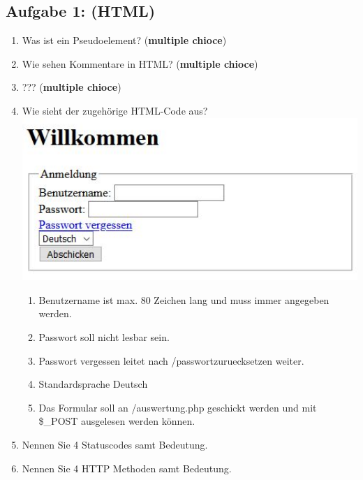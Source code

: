 \subsection{Aufgabe 1: (HTML)}
\label{sec:Aufgabe1}
\begin{enumerate}[label=\alph*)]
    \item Was ist ein Pseudoelement? (\textbf{multiple chioce})
    \item Wie sehen Kommentare in HTML? (\textbf{multiple chioce})
    \item ??? (\textbf{multiple chioce})
    \item Wie sieht der zugehörige HTML-Code aus? \\
        \includegraphics[width=15cm]{img/klausur.JPG}
        \begin{enumerate}[label=\arabic*.]
            \item Benutzername ist max. 80 Zeichen lang und muss immer angegeben werden.
            \item Passwort soll nicht lesbar sein.
            \item Passwort vergessen leitet nach /passwortzuruecksetzen weiter.
            \item Standardsprache Deutsch
            \item Das Formular soll an /auswertung.php geschickt werden und mit \$\_POST ausgelesen werden können.
         \end{enumerate}
    \item Nennen Sie 4 Statuscodes samt Bedeutung.
    \item Nennen Sie 4 HTTP Methoden samt Bedeutung.
\end{enumerate}